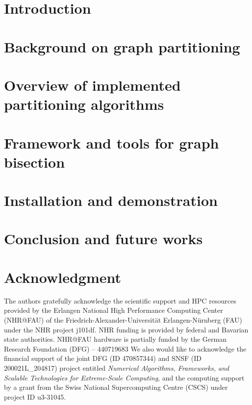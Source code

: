 \documentclass{juliacon}
\begin{document}


\maketitle

\begin{abstract}
    
\end{abstract}

\section{Introduction}
    

\section{Background on graph partitioning}
    \label{sec:background}
    

\section{Overview of implemented partitioning algorithms}
    \label{sec:algo}
    

\section{Framework and tools for graph bisection}
    \label{sec:framwork}
    

\section{Installation and demonstration}
    \label{sec:demo}
    


\section{Conclusion and future works}
    \label{sec:conclusion}
    
\FloatBarrier
\section{Acknowledgment}
The authors gratefully acknowledge the scientific support and HPC resources provided by the Erlangen National High Performance Computing Center (NHR@FAU) of the Friedrich-Alexander-Universität Erlangen-Nürnberg (FAU) under the NHR project j101df. NHR funding is provided by federal and Bavarian state authorities. NHR@FAU hardware is partially funded by the German Research Foundation (DFG) – 440719683
We also would like to acknowledge the financial support of the joint DFG (ID 470857344) and
SNSF (ID 200021L\_204817) project entitled \textit{Numerical Algorithms, Frameworks, and Scalable Technologies for Extreme-Scale Computing}, and the computing  support by a grant from the Swiss National Supercomputing Centre (CSCS)
under project ID u3-31045.

% 

\end{document}
